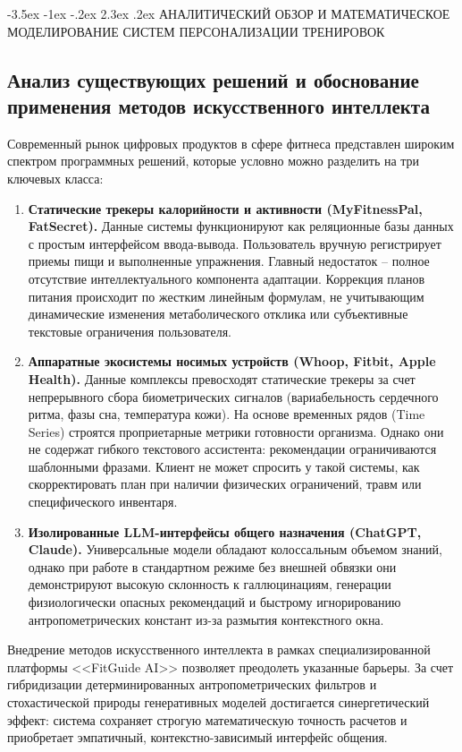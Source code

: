 \documentclass[14pt, a4paper]{extarticle}
\makeatletter
\renewcommand\section{\@startsection {section}{1}{\z@}%
                                   {-3.5ex \@plus -1ex \@minus -.2ex}%
                                   {2.3ex \@plus.2ex}%
                                   {\centering\normalfont\Large\bfseries}}
\makeatother
\begin{document}
\section{АНАЛИТИЧЕСКИЙ ОБЗОР И МАТЕМАТИЧЕСКОЕ МОДЕЛИРОВАНИЕ СИСТЕМ ПЕРСОНАЛИЗАЦИИ ТРЕНИРОВОК}

\subsection{Анализ существующих решений и обоснование применения методов искусственного интеллекта}

Современный рынок цифровых продуктов в сфере фитнеса представлен широким спектром программных решений, которые условно можно разделить на три ключевых класса:

\begin{enumerate}
    \item \textbf{Статические трекеры калорийности и активности (MyFitnessPal, FatSecret).} Данные системы функционируют как реляционные базы данных с простым интерфейсом ввода-вывода. Пользователь вручную регистрирует приемы пищи и выполненные упражнения. Главный недостаток -- полное отсутствие интеллектуального компонента адаптации. Коррекция планов питания происходит по жестким линейным формулам, не учитывающим динамические изменения метаболического отклика или субъективные текстовые ограничения пользователя.
    \item \textbf{Аппаратные экосистемы носимых устройств (Whoop, Fitbit, Apple Health).} Данные комплексы превосходят статические трекеры за счет непрерывного сбора биометрических сигналов (вариабельность сердечного ритма, фазы сна, температура кожи). На основе временных рядов (Time Series) строятся проприетарные метрики готовности организма. Однако они не содержат гибкого текстового ассистента: рекомендации ограничиваются шаблонными фразами. Клиент не может спросить у такой системы, как скорректировать план при наличии физических ограничений, травм или специфического инвентаря.
    \item \textbf{Изолированные LLM-интерфейсы общего назначения (ChatGPT, Claude).} Универсальные модели обладают колоссальным объемом знаний, однако при работе в стандартном режиме без внешней обвязки они демонстрируют высокую склонность к галлюцинациям, генерации физиологически опасных рекомендаций и быстрому игнорированию антропометрических констант из-за размытия контекстного окна.
\end{enumerate}

Внедрение методов искусственного интеллекта в рамках специализированной платформы <<FitGuide AI>> позволяет преодолеть указанные барьеры. За счет гибридизации детерминированных антропометрических фильтров и стохастической природы генеративных моделей достигается синергетический эффект: система сохраняет строгую математическую точность расчетов и приобретает эмпатичный, контекстно-зависимый интерфейс общения.
\end{document}
